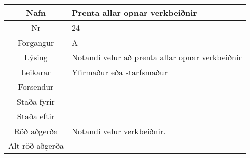 \documentclass[a4paper]{article}
\begin{document}
\begin{tabular}{|c|p{10cm}|}
\hline
Nafn&Prenta allar opnar verkbeiðnir\\
\hline
Nr&24\\
\hline
Forgangur&A\\
\hline
Lýsing&Notandi velur að prenta allar opnar verkbeiðnir\\
\hline
Leikarar&Yfirmaður eða starfsmaður\\
\hline
Forsendur&\\
\hline
Staða fyrir&\\
\hline
Staða eftir&\\
\hline
Röð aðgerða&Notandi velur verkbeiðnir.\\
\hline
Alt röð aðgerða&\\
\hline
\end{tabular}
\end{document}
